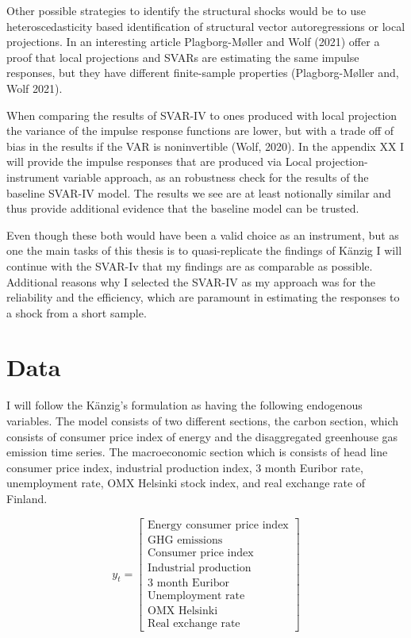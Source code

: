 \documentclass[
  12pt,
  a4paper,
]{report}
\begin{document}
Other possible strategies to identify the structural shocks would be to use heteroscedasticity based identification of structural vector autoregressions or local projections. In an interesting article Plagborg-Møller and Wolf (2021) offer a proof that local projections and SVARs are estimating the same impulse responses, but they have different finite-sample properties (Plagborg-Møller and, Wolf 2021).

When comparing the results of SVAR-IV to ones produced with local projection the variance of the impulse response functions are lower, but with a trade off of bias in the results if the VAR is noninvertible (Wolf, 2020). In the appendix XX I will provide the impulse responses that are produced via Local projection-instrument variable approach, as an robustness check for the results of the baseline SVAR-IV model. The results we see are at least notionally similar and thus provide additional evidence that the baseline model can be trusted.

Even though these both would have been a valid choice as an instrument, but as one the main tasks of this thesis is to quasi-replicate the findings of Känzig I will continue with the SVAR-Iv that my findings are as comparable as possible. Additional reasons why I selected the SVAR-IV as my approach was for the reliability and the efficiency, which are paramount in estimating the responses to a shock from a short sample.

\hypertarget{data}{%
\chapter{Data}\label{data}}

I will follow the Känzig's formulation as having the following endogenous variables. The model consists of two different sections, the carbon section, which consists of consumer price index of energy and the disaggregated greenhouse gas emission time series. The macroeconomic section which is consists of head line consumer price index, industrial production index, 3 month Euribor rate, unemployment rate, OMX Helsinki stock index, and real exchange rate of Finland.

\[
y_t =
\begin{bmatrix}
\text{Energy consumer price index} \\
\text{GHG emissions} \\
\text{Consumer price index} \\
\text{Industrial production} \\
\text{3 month Euribor} \\
\text{Unemployment rate} \\
\text{OMX Helsinki} \\
\text{Real exchange rate}
\end{bmatrix}
\]
\end{document}
